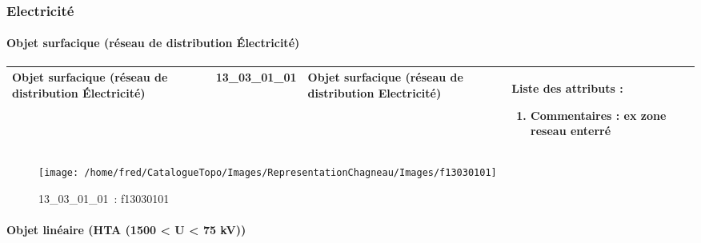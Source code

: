 \documentclass[12pt,titlepage]{book}
\begin{document}
\subsubsection{\large Electricité}
\paragraph{Objet surfacique (réseau de distribution Électricité)}
\noindent
\vspace{\baselineskip}

\renewcommand{\arraystretch}{1.2}
\begin{supertabular}{|p{10cm}|c|p{13cm}|p{12cm}|}
 Objet surfacique (réseau de distribution Électricité) & 13\_03\_01\_01 & Objet surfacique (réseau de distribution Electricité) & Liste des attributs :
\begin{enumerate}
  \item Commentaires : ex zone reseau enterré\end{enumerate}
\\
\hline
\end{supertabular}
\begin{figure}[h!]
  \hfill         %
  \begin{minipage}[t]{3cm}
    \begin{center}
      \texttt{[image: /home/fred/CatalogueTopo/Images/RepresentationChagneau/Images/f13030101]}
      \caption[~13\_03\_01\_01]{\small{13\_03\_01\_01~:} \tiny{f13030101}}\label{f13030101}
    \end{center}
  \end{minipage}
\end{figure}


\paragraph{Objet linéaire (HTA (1500 < U < 75 kV))}
\noindent
\vspace{\baselineskip}
\end{document}
